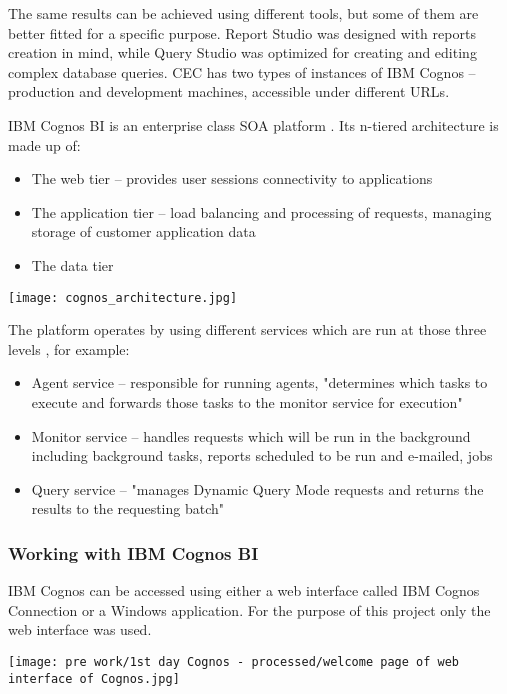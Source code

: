 The same results can be achieved using different tools, but some of them are better fitted for a specific purpose. Report Studio was designed with reports creation in mind, while Query Studio was optimized for creating and editing complex database queries. CEC has two types of instances of IBM Cognos – production and development machines, accessible under different URLs.

IBM Cognos BI is an enterprise class SOA platform \citep{browne2010ibm}. Its n-tiered architecture is made up of:
\begin{itemize}
\item The web tier – provides user sessions connectivity to applications
\item The application tier – load balancing and processing of requests, managing storage of customer application data
\item The data tier
\end{itemize}


\begin{center}
  \texttt{[image: cognos\_architecture.jpg]}
\end{center}


The platform operates by using different services which are run at those three levels \citep{Browne2010}, for example:
\begin{itemize}
\item Agent service – responsible for running agents, "determines which tasks to execute and forwards those tasks to the monitor service for execution"
\item Monitor service – handles requests which will be run in the background including background tasks, reports scheduled to be run and e-mailed, jobs
\item Query service – "manages Dynamic Query Mode requests and returns the results to the requesting batch"
\end{itemize}
		
			
			\subsubsection{Working with IBM Cognos BI}
			
IBM Cognos can be accessed using either a web interface called IBM Cognos Connection or a Windows application. For the purpose of this project only the web interface was used.

\begin{center}
  \texttt{[image: pre work/1st day Cognos - processed/welcome page of web interface of Cognos.jpg]}
\end{center}



